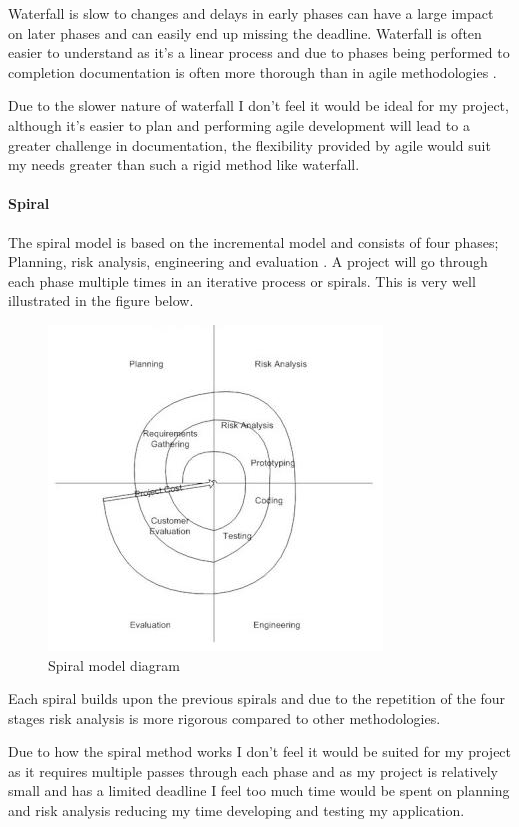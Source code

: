 Waterfall is slow to changes and delays in early phases can have a large
impact on later phases and can easily end up missing the deadline.
Waterfall is often easier to understand as it's a linear process and due
to phases being performed to completion documentation is often more
thorough than in agile methodologies \cite{agilevswaterfall}.

Due to the slower nature of waterfall I don't feel it would be ideal for
my project, although it's easier to plan and performing agile
development will lead to a greater challenge in documentation, the
flexibility provided by agile would suit my needs greater than such a
rigid method like waterfall.

\paragraph{Spiral}\label{spiral}

The spiral model is based on the incremental model and consists of four
phases; Planning, risk analysis, engineering and evaluation
\cite{spiral}. A project will go through each phase multiple times in an
iterative process or spirals. This is very well illustrated in the
figure below.

\begin{figure}[htbp]
\centering
\includegraphics{../../Images/Spiral-model.jpg}
\caption{Spiral model diagram \cite{spiral}}
\end{figure}

Each spiral builds upon the previous spirals and due to the repetition
of the four stages risk analysis is more rigorous compared to other
methodologies.

Due to how the spiral method works I don't feel it would be suited for
my project as it requires multiple passes through each phase and as my
project is relatively small and has a limited deadline I feel too much
time would be spent on planning and risk analysis reducing my time
developing and testing my application.

